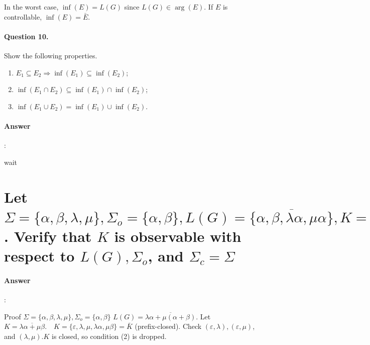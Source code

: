 \documentclass{article}
\begin{document}
In the worst case, $\inf (E)=L(G)$ since $L(G) \in \arg (E)$. If $E$ is controllable, $\inf (E)=\bar{E}$.

\paragraph{Question 10.} Show the following properties.

\begin{enumerate}
  \item  $E_1 \subseteq E_2 \Longrightarrow \inf \left(E_1\right) \subseteq \inf \left(E_2\right)$;
  \item $\inf \left(E_1 \cap E_2\right) \subseteq \inf \left(E_1\right) \cap \inf \left(E_2\right)$;
  \item $\inf \left(E_1 \cup E_2\right)=\inf \left(E_1\right) \cup \inf \left(E_2\right)$.
\end{enumerate}

\paragraph{Answer}:

wait

\section{Let $\Sigma=\{\alpha, \beta, \lambda, \mu\}, \Sigma_o=\{\alpha, \beta\}, L(G)=\overline{\{\alpha, \beta, \lambda \alpha, \mu \alpha\}}, K=\overline{\{\alpha, \lambda \alpha\}}$. Verify that $K$ is observable with respect to $L(G), \Sigma_o$, and $\Sigma_c=\Sigma$}

\paragraph{Answer}:

Proof $\Sigma=\{\alpha, \beta, \lambda, \mu\}, \Sigma_o=\{\alpha, \beta\}$ $L(G)=\overline{\lambda \alpha+\mu(\alpha+\beta)}$. Let $K=\overline{\lambda \alpha+\mu \beta} . \quad K=\{\varepsilon, \lambda, \mu, \lambda \alpha, \mu \beta\}=\bar{K}$ (prefix-closed). Check $(\varepsilon, \lambda),(\varepsilon, \mu)$, and $(\lambda, \mu) . K$ is closed, so condition (2) is dropped.
\end{document}

